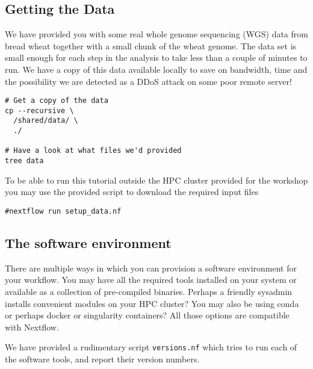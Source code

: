 \subsection{Getting the Data}

We have provided you with some real whole genome sequencing (WGS) data from bread wheat together with a small chunk of the wheat genome.
The data set is small enough for each step in the analysis to take less than a couple of minutes to run. 
We have a copy of this data available locally to save on bandwidth, time and the possibility we are detected as a DDoS attack on some poor remote server!

\begin{steps}
\begin{lstlisting}
# Get a copy of the data
cp --recursive \
  /shared/data/ \
  ./

# Have a look at what files we'd provided
tree data
\end{lstlisting}
\end{steps}

\begin{warning}
To be able to run this tutorial outside the HPC cluster provided for the workshop you may use 
the provided script to download the required input files
\begin{lstlisting}
#nextflow run setup_data.nf
\end{lstlisting}
\end{warning}

\subsection{The software environment}

There are multiple ways in which you can provision a software environment for your workflow.
You may have all the required tools installed on your system or available as a collection of pre-compiled binaries. Perhaps a friendly sysadmin installs convenient modules on your HPC cluster? You may also be using conda or perhaps docker or singularity containers? All those options are compatible with Nextflow. 

We have provided a rudimentary script \texttt{versions.nf} which tries to run each of the software tools,
and report their version numbers. 

